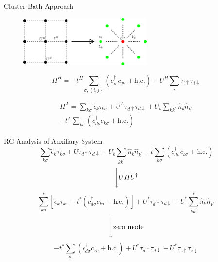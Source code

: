 \documentclass[aspectratio=169]{beamer}
\begin{document}
\begin{frame}{Cluster-Bath Approach}
	\begin{figure}[htpb]
		\centering
		\includegraphics[width=0.6\textwidth]{./cluster-bath.png}
	\end{figure}

\begin{minipage}{0.45\textwidth}
	\[H^H = -t^H\sum_{\sigma,\left<i,j \right>}\left(c^\dagger_{i\sigma} c_{j\sigma} + \text{h.c.}\right) + U^H\sum_i \tau_{i \uparrow} \tau_{i \downarrow}\]
\end{minipage}
\hspace*{15pt}
\begin{minipage}{0.5\textwidth}
	\begin{equation*}\begin{aligned}
H^A = \sum_{k\sigma}\tilde\epsilon_k\tau_{k\sigma} + U^A \tau_{d \uparrow} \tau_{d \downarrow} + U_b \sum_{kk^\prime}\hat n_k \hat n_{k^\prime}\\
-t^A\sum_{k\sigma}\left(c^\dagger_{d\sigma}c_{k\sigma} + \text{h.c.}\right)
\end{aligned}\end{equation*}
\end{minipage}
\end{frame}
\begin{frame}{RG Analysis of Auxiliary System}
	\[\sum_{k\sigma}\tilde\epsilon_k\tau_{k\sigma} + U \tau_{d \uparrow} \tau_{d \downarrow} + U_b \sum_{kk^\prime}\hat n_k \hat n_{k^\prime} -t\sum_{k\sigma}\left(c^\dagger_{d\sigma}c_{k\sigma} + \text{h.c.}\right)\]
	\[\Bigg\downarrow U H U^\dagger\]
	\[\sum_{k\sigma}^*\left[\tilde\epsilon_k\tau_{k\sigma} -{t}^*\left(c^\dagger_{d\sigma}c_{k\sigma} + \text{h.c.}\right)\right] + U^* \tau_{d \uparrow} \tau_{d \downarrow} + U^* \sum_{kk^\prime}^*\hat n_k \hat n_{k^\prime} \]
	\[\Bigg\downarrow \text{zero mode}\]
	\[-{t}^*\sum_{\sigma}\left(c^\dagger_{d\sigma}c_{z\sigma} + \text{h.c.}\right) + U^* \tau_{d \uparrow} \tau_{d \downarrow} + U^* \tau_{z \uparrow} \tau_{z \downarrow} \]
\end{frame}
\end{document}
